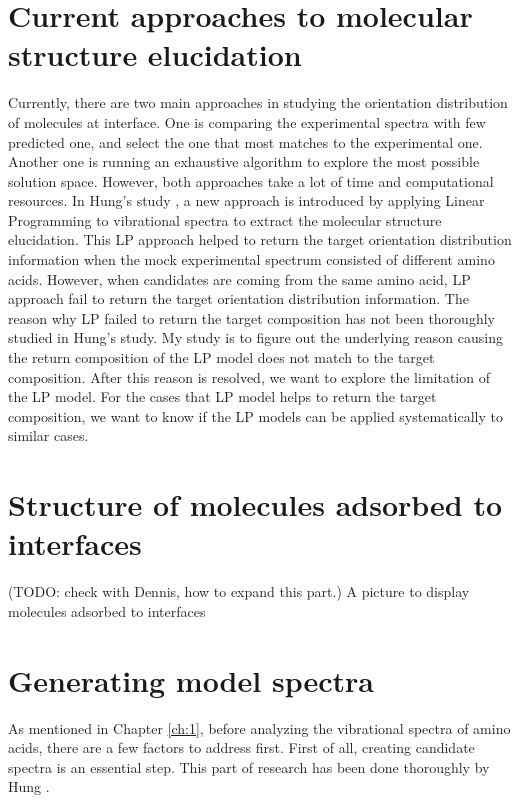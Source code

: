 \label{ch:2}
\section{Current approaches to molecular structure elucidation}
Currently, there are two main approaches in studying the orientation distribution of molecules at interface. One is comparing the experimental spectra with few predicted one, and select the one that most matches to the experimental one. Another one is running an exhaustive algorithm to explore the most possible solution space. \cite{hore0033-rotations}  However, both approaches take a lot of time and computational resources. In Hung's study \cite{KuoKaiHung:Thesis:2015}, a new approach is introduced by applying Linear Programming to vibrational spectra to extract the molecular structure elucidation. This LP approach helped to return the target orientation distribution information when the mock experimental spectrum consisted of different amino acids. However, when candidates are coming from the same amino acid, LP approach fail to return the target orientation distribution information. The reason why LP failed to return the target composition has not been thoroughly studied in Hung's study. My study is to figure out the underlying reason causing the return composition of the LP model does not match to the target composition. After this reason is resolved, we want to explore the limitation of the LP model. For the cases that LP model helps to return the target composition, we want to know if the LP models can be applied systematically to similar cases. \\
	
\section{Structure of molecules adsorbed to interfaces}
(TODO: check with Dennis, how to expand this part.) A picture to display molecules adsorbed to interfaces


\section{Generating model spectra}
As mentioned in Chapter \ref{ch:1}, before analyzing the vibrational spectra of amino acids, there are a few factors to address first. First of all, creating candidate spectra is an essential step. This part of research has been done thoroughly by Hung \cite{KuoKaiHung:Thesis:2015}. \\

